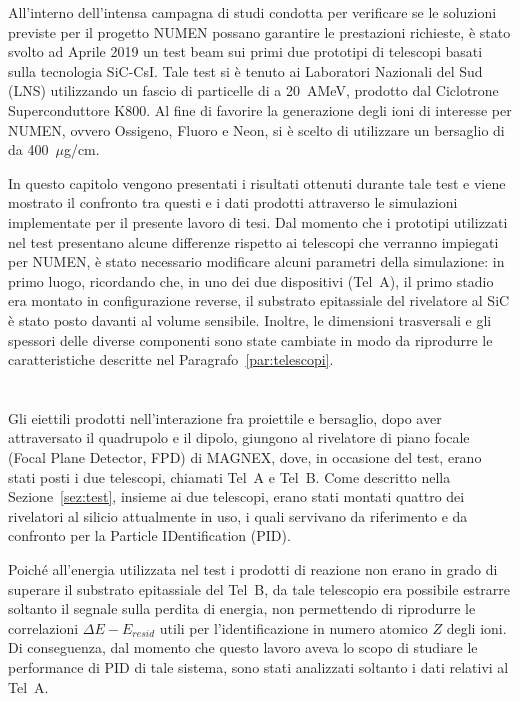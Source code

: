 
All'interno dell'intensa campagna di studi condotta per verificare se le soluzioni previste per il progetto NUMEN possano garantire le prestazioni richieste, è stato svolto ad Aprile 2019 un test beam sui primi due prototipi di telescopi basati sulla tecnologia SiC-CsI.
Tale test si è tenuto ai Laboratori Nazionali del Sud (LNS) utilizzando un fascio di particelle di  a 20~AMeV, prodotto dal Ciclotrone Superconduttore K800.
Al fine di favorire la generazione degli ioni di interesse per NUMEN, ovvero Ossigeno, Fluoro e Neon, si è scelto di utilizzare un bersaglio di  da 400~$\mu$g/cm.


In questo capitolo vengono presentati i risultati ottenuti durante tale test e viene mostrato il confronto tra questi e i dati prodotti attraverso le simulazioni implementate per il presente lavoro di tesi. 
Dal momento che i prototipi utilizzati nel test presentano alcune differenze rispetto ai telescopi che verranno impiegati per NUMEN, è stato necessario modificare alcuni parametri della simulazione: in primo luogo, ricordando che, in uno dei due dispositivi (Tel~A), il primo stadio era montato in configurazione reverse, il substrato epitassiale del rivelatore al SiC è stato posto davanti al volume sensibile.
Inoltre, le dimensioni trasversali e gli spessori delle diverse componenti sono state cambiate in modo da riprodurre le caratteristiche descritte nel Paragrafo~\ref{par:telescopi}.


\section{}


Gli eiettili prodotti nell'interazione fra proiettile e bersaglio, dopo aver attraversato il quadrupolo e il dipolo, giungono al rivelatore di piano focale (Focal Plane Detector, FPD) di MAGNEX, dove, in occasione del test, erano stati posti i due telescopi, chiamati Tel~A e Tel~B. 
Come descritto nella Sezione~\ref{sez:test}, insieme ai due telescopi, erano stati montati quattro dei rivelatori al silicio attualmente in uso, i quali servivano da riferimento e da confronto per la Particle IDentification (PID).

Poiché all'energia utilizzata nel test i prodotti di reazione non erano in grado di superare il substrato epitassiale del Tel~B, da tale telescopio era possibile estrarre soltanto il segnale sulla perdita di energia, non permettendo di riprodurre le correlazioni $\Delta E - E_{resid}$ utili per l'identificazione in numero atomico $Z$ degli ioni.
Di conseguenza, dal momento che questo lavoro aveva lo scopo di studiare le performance di PID di tale sistema, sono stati analizzati soltanto i dati relativi al Tel~A.


